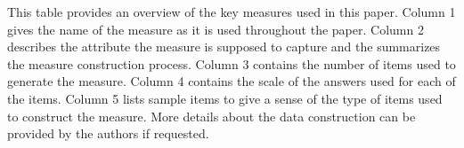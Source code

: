 \begin{landscape}
\begin{table}[!htb]
\begin{adjustbox}{width=1.5\textwidth, totalheight=\baselineskip,keepaspectratio}
\begin{threeparttable}
\begin{tabularx}{1.6\textwidth}{c | X | c | l | X }
    \hline
    \bottomrule
    \end{tabularx}
    \begin{longnote} This table provides an overview of the key measures used in this paper. Column 1 gives the name of the measure as it is used throughout the paper. Column 2 describes the attribute the measure is supposed to capture and the summarizes the measure construction process. Column 3 contains the number of items used to generate the measure. Column 4 contains the scale of the answers used for each of the items. Column 5 lists sample items to give a sense of the type of items used to construct the measure. More details about the data construction can be provided by the authors if requested. 
    \end{longnote}
    \end{threeparttable}
    \end{adjustbox}
    \end{table}
    \hfill
    \end{landscape}
